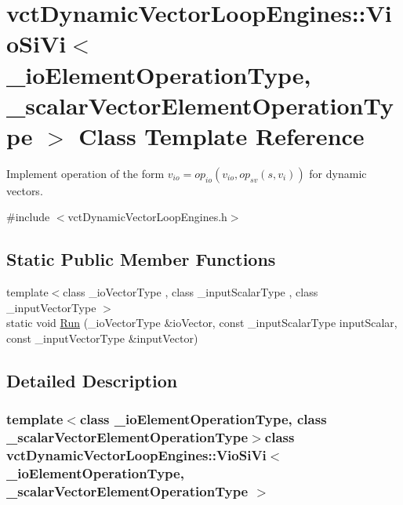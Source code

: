\hypertarget{classvct_dynamic_vector_loop_engines_1_1_vio_si_vi}{}\section{vct\+Dynamic\+Vector\+Loop\+Engines\+:\+:Vio\+Si\+Vi$<$ \+\_\+io\+Element\+Operation\+Type, \+\_\+scalar\+Vector\+Element\+Operation\+Type $>$ Class Template Reference}
\label{classvct_dynamic_vector_loop_engines_1_1_vio_si_vi}


Implement operation of the form $v_{io} = op_{io}(v_{io}, op_{sv}(s, v_i))$ for dynamic vectors.  




{\ttfamily \#include $<$vct\+Dynamic\+Vector\+Loop\+Engines.\+h$>$}

\subsection*{Static Public Member Functions}
\begin{DoxyCompactItemize}
\item 
{\footnotesize template$<$class \+\_\+io\+Vector\+Type , class \+\_\+input\+Scalar\+Type , class \+\_\+input\+Vector\+Type $>$ }\\static void \hyperlink{classvct_dynamic_vector_loop_engines_1_1_vio_si_vi_aa33d203e2e29f5b88729ccefd2e57af4}{Run} (\+\_\+io\+Vector\+Type \&io\+Vector, const \+\_\+input\+Scalar\+Type input\+Scalar, const \+\_\+input\+Vector\+Type \&input\+Vector)
\end{DoxyCompactItemize}


\subsection{Detailed Description}
\subsubsection*{template$<$class \+\_\+io\+Element\+Operation\+Type, class \+\_\+scalar\+Vector\+Element\+Operation\+Type$>$class vct\+Dynamic\+Vector\+Loop\+Engines\+::\+Vio\+Si\+Vi$<$ \+\_\+io\+Element\+Operation\+Type, \+\_\+scalar\+Vector\+Element\+Operation\+Type $>$}

